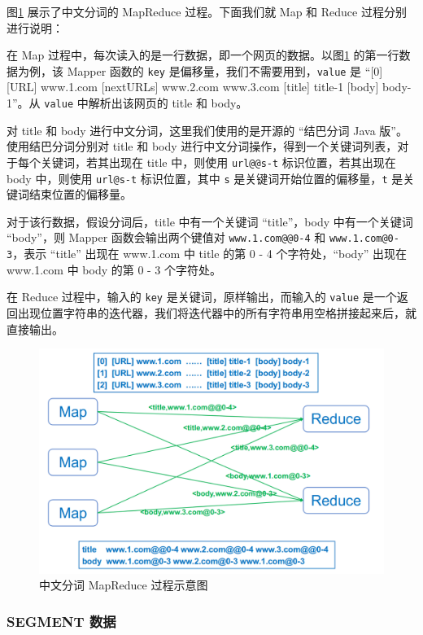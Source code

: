 \documentclass{ctexart}
\newcommand{\code}[1]{\colorbox{backcolor}{\lstinline|#1|}}
\begin{document}
    图\ref{fig:segment} 展示了中文分词的 MapReduce 过程。下面我们就 Map 和 Reduce 过程分别进行说明：

    在 Map 过程中，每次读入的是一行数据，即一个网页的数据。以图\ref{fig:segment} 的第一行数据为例，该 Mapper 函数的 \code{key} 是偏移量，我们不需要用到，\code{value} 是 “[0] [URL] www.1.com [nextURLs] www.2.com www.3.com [title] title-1 [body] body-1”。从 \code{value} 中解析出该网页的 title 和 body。

    对 title 和 body 进行中文分词，这里我们使用的是开源的 “结巴分词 Java 版”\cite{github-jieba-java}。使用结巴分词分别对 title 和 body 进行中文分词操作，得到一个关键词列表，对于每个关键词，若其出现在 title 中，则使用 \code{url@@s-t} 标识位置，若其出现在 body 中，则使用 \code{url@s-t} 标识位置，其中 \code{s} 是关键词开始位置的偏移量，\code{t} 是关键词结束位置的偏移量。

    对于该行数据，假设分词后，title 中有一个关键词 “title”，body 中有一个关键词 “body”，则 Mapper 函数会输出两个键值对 \code{www.1.com@@0-4} 和 \code{www.1.com@0-3}，表示 “title” 出现在 www.1.com 中 title 的第 0 - 4 个字符处，“body” 出现在 www.1.com 中 body 的第 0 - 3 个字符处。

    在 Reduce 过程中，输入的 \code{key} 是关键词，原样输出，而输入的 \code{value} 是一个返回出现位置字符串的迭代器，我们将迭代器中的所有字符串用空格拼接起来后，就直接输出。

    \begin{figure}[t]
        \centering
        \includegraphics[width=\textwidth]{src/segment}
        \caption{中文分词 MapReduce 过程示意图}
        \label{fig:segment}
    \end{figure}

    \subsubsection{SEGMENT 数据}\label{subsubsec:segment_data}
\end{document}
